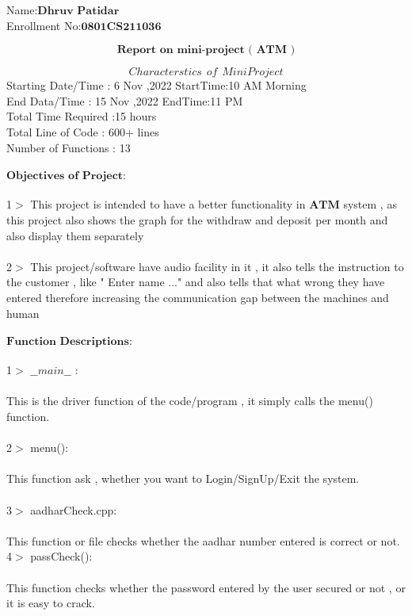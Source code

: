 \documentclass[11pt]{article}
\begin{document}
Name:$\textbf{Dhruv Patidar}$\\

Enrollment No:$\textbf{0801CS211036}$

$$\textbf{Report on mini-project ( ATM )}$$

$$Characterstics \hspace{5pt} of\hspace{5pt} MiniProject$$
Starting Date/Time : 6 Nov ,2022 StartTime:10 AM Morning\\
End Data/Time : 15 Nov ,2022 EndTime:11 PM \\
Total Time Required :15 hours \\
Total Line of Code : 600+ lines\\
Number of Functions : 13\\\\
$\textbf{Objectives of Project} :$ \\\\
1$>$ This project is intended to have a better functionality in $\textbf{ATM}$ system , as this project also shows the graph for the withdraw and deposit per month and also display them separately\\\\
2$>$ This project/software have audio facility in it , it also tells the instruction to the customer , like " Enter name ..." and also tells that what wrong they have entered therefore increasing the communication gap between the machines and human\\\\
$\textbf{Function Descriptions} :$\\\\
1$>$ $\_\_main\_\_$ :\\\\
This is the driver function of the code/program , it simply calls the menu() function.\\\\
2$>$ menu():\\\\
This function ask , whether you want to Login/SignUp/Exit the system.\\\\
3$>$ aadharCheck.cpp:\\\\
This function or file checks whether the aadhar number entered is correct or not.
4$>$ passCheck():\\\\
This function checks whether the password entered by the user secured or not , or it is easy to crack.\\\\
\end{document}
